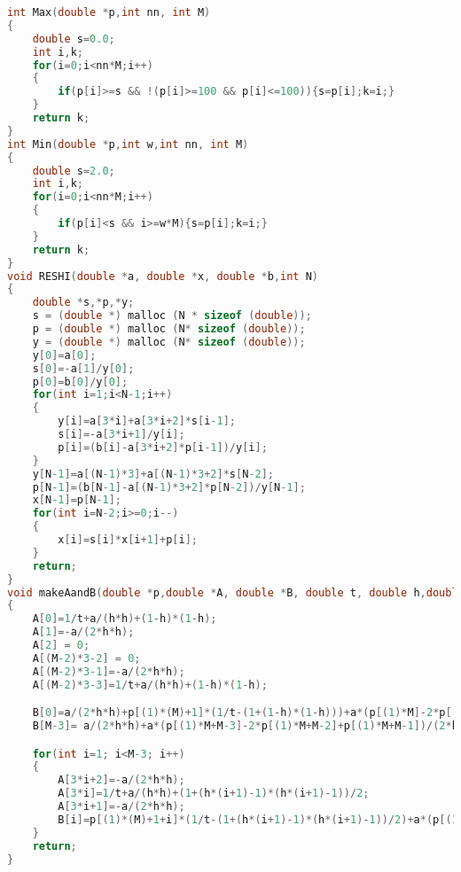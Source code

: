\documentclass{article}
\theoremstyle{remark}
\theoremstyle{definition}
\begin{document}
\begin{lstlisting}[language=C]
int Max(double *p,int nn, int M)
{
    double s=0.0;
    int i,k;
    for(i=0;i<nn*M;i++)
    {
        if(p[i]>=s && !(p[i]>=100 && p[i]<=100)){s=p[i];k=i;}
    }
    return k;
}
int Min(double *p,int w,int nn, int M)
{
    double s=2.0;
    int i,k;
    for(i=0;i<nn*M;i++)
    {
        if(p[i]<s && i>=w*M){s=p[i];k=i;}
    }
    return k;
}
void RESHI(double *a, double *x, double *b,int N)
{
    double *s,*p,*y;
    s = (double *) malloc (N * sizeof (double));
    p = (double *) malloc (N* sizeof (double));
    y = (double *) malloc (N* sizeof (double));
    y[0]=a[0];
    s[0]=-a[1]/y[0];
    p[0]=b[0]/y[0];
    for(int i=1;i<N-1;i++)
    {
        y[i]=a[3*i]+a[3*i+2]*s[i-1];
        s[i]=-a[3*i+1]/y[i];
        p[i]=(b[i]-a[3*i+2]*p[i-1])/y[i];
    }
    y[N-1]=a[(N-1)*3]+a[(N-1)*3+2]*s[N-2];
    p[N-1]=(b[N-1]-a[(N-1)*3+2]*p[N-2])/y[N-1];
    x[N-1]=p[N-1];
    for(int i=N-2;i>=0;i--)
    {
        x[i]=s[i]*x[i+1]+p[i];
    }
    return;
}
void makeAandB(double *p,double *A, double *B, double t, double h,double a, int j, int M)
{
    A[0]=1/t+a/(h*h)+(1-h)*(1-h);
    A[1]=-a/(2*h*h);
    A[2] = 0;
    A[(M-2)*3-2] = 0;
    A[(M-2)*3-1]=-a/(2*h*h);
    A[(M-2)*3-3]=1/t+a/(h*h)+(1-h)*(1-h);

    B[0]=a/(2*h*h)+p[(1)*(M)+1]*(1/t-(1+(1-h)*(1-h)))+a*(p[(1)*M]-2*p[(1)*M+1]+p[(1)*M+2])/(2*h*h);
    B[M-3]= a/(2*h*h)+a*(p[(1)*M+M-3]-2*p[(1)*M+M-2]+p[(1)*M+M-1])/(2*h*h)+p[(1)*(M)+M-2]*(1/t-(1+(1-h)*(1-h)));

    for(int i=1; i<M-3; i++)
    {
        A[3*i+2]=-a/(2*h*h);
        A[3*i]=1/t+a/(h*h)+(1+(h*(i+1)-1)*(h*(i+1)-1))/2;
        A[3*i+1]=-a/(2*h*h);
        B[i]=p[(1)*(M)+1+i]*(1/t-(1+(h*(i+1)-1)*(h*(i+1)-1))/2)+a*(p[(1)*M+i]-2*p[(1)*M+1+i]+p[(1)*M+2+i])/(2*h*h);
    }
    return;
}

	\end{lstlisting}
\end{document}
